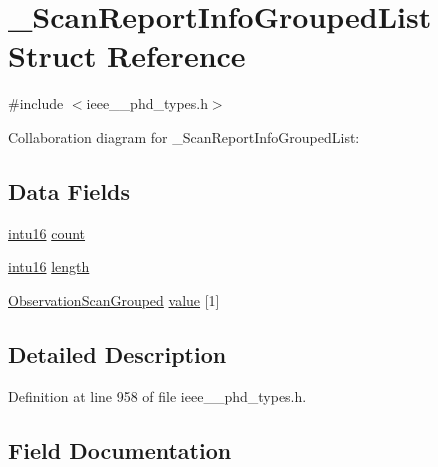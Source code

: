 \hypertarget{struct___scan_report_info_grouped_list}{}\section{\+\_\+\+Scan\+Report\+Info\+Grouped\+List Struct Reference}
\label{struct___scan_report_info_grouped_list}


{\ttfamily \#include $<$ieee\+\_\+\_\+phd\+\_\+types.\+h$>$}



Collaboration diagram for \+\_\+\+Scan\+Report\+Info\+Grouped\+List\+:
\subsection*{Data Fields}
\begin{DoxyCompactItemize}
\item 
\hyperlink{ieee__11073__phd__types_8h_a3561595d2aa7416532e1c9910abd076d}{intu16} \hyperlink{struct___scan_report_info_grouped_list_abf6db060ae8e224764b0f867fb135ecd}{count}
\item 
\hyperlink{ieee__11073__phd__types_8h_a3561595d2aa7416532e1c9910abd076d}{intu16} \hyperlink{struct___scan_report_info_grouped_list_a3743679e4ff85e3e1b3fc2e59973fbb3}{length}
\item 
\hyperlink{ieee__11073__phd__types_8h_a4cdea7a5ef6dd39de2bcc4f8d72e166a}{Observation\+Scan\+Grouped} \hyperlink{struct___scan_report_info_grouped_list_afa4932a0557a04358beaf6f7d8a69467}{value} \mbox{[}1\mbox{]}
\end{DoxyCompactItemize}


\subsection{Detailed Description}


Definition at line 958 of file ieee\+\_\+\_\+phd\+\_\+types.\+h.



\subsection{Field Documentation}
\hypertarget{struct___scan_report_info_grouped_list_abf6db060ae8e224764b0f867fb135ecd}{}
